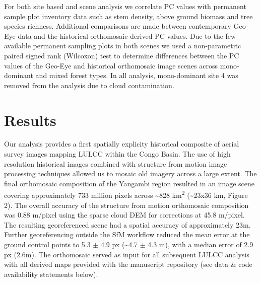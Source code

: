 \documentclass[remote sensing,article,submit,moreauthors,pdftex,10pt,a4paper]{mdpi}
\begin{document}
For both site based and scene analysis we correlate PC values with
permanent sample plot inventory data such as stem density, above ground
biomass and tree species richness. Additional comparisons are made
between contemporary Geo-Eye data and the historical orthomosaic derived
PC values. Due to the few available permanent sampling plots in both
scenes we used a non-parametric paired signed rank (Wilcoxon) test to
determine differences between the PC values of the Geo-Eye and
historical orthomosaic image scenes across mono-dominant and mixed
forest types. In all analysis, mono-dominant site 4 was removed from the
analysis due to cloud contamination.

\hypertarget{results}{%
\section{Results}\label{results}}

Our analysis provides a first spatially explicity historical composite
of aerial survey images mapping LULCC within the Congo Basin. The use of
high resolution historical images combined with structure from motion
image processing techniques allowed us to mosaic old imagery across a
large extent. The final orthomosaic composition of the Yangambi region
resulted in an image scene covering approximately 733 million pixels
across \textasciitilde{}828 km\textsuperscript{2}
(\textasciitilde{}23x36 km, Figure 2). The overall accuracy of the
structure from motion orthomosaic composition was 0.88 m/pixel using the
sparse cloud DEM for corrections at 45.8 m/pixel. The resulting
georeferenced scene had a spatial accuracy of approximately 23m. Further
georeferencing outside the SfM workflow reduced the mean error at the
ground control points to 5.3 \(\pm\) 4.9 px (\textasciitilde{}4.7
\(\pm\) 4.3 m), with a median error of 2.9 px (2.6m). The orthomosaic
served as input for all subsequent LULCC analysis with all derived maps
provided with the manuscript repository (see data \& code availability
statements below).
\end{document}
